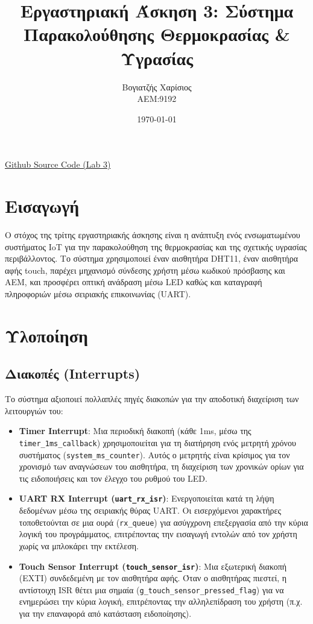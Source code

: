 \documentclass{article}
\title{Εργαστηριακή Άσκηση 3: Σύστημα Παρακολούθησης Θερμοκρασίας & Υγρασίας}
\author{Βογιατζής Χαρίσιος \\ ΑΕΜ:9192}
\date{\today}
\begin{document}
\maketitle

\begin{center}
\href{https://github.com/charisvt/micro-lab3}{Github Source Code (Lab 3)}
\end{center}

\section{Εισαγωγή}

Ο στόχος της τρίτης εργαστηριακής άσκησης είναι η ανάπτυξη ενός ενσωματωμένου συστήματος IoT για την παρακολούθηση της θερμοκρασίας και της σχετικής υγρασίας περιβάλλοντος. Το σύστημα χρησιμοποιεί έναν αισθητήρα DHT11, έναν αισθητήρα αφής touch, παρέχει μηχανισμό σύνδεσης χρήστη μέσω κωδικού πρόσβασης και ΑΕΜ, και προσφέρει οπτική ανάδραση μέσω LED καθώς και καταγραφή πληροφοριών μέσω σειριακής επικοινωνίας (UART).

\section{Υλοποίηση}

\subsection{Διακοπές (Interrupts)}
Το σύστημα αξιοποιεί πολλαπλές πηγές διακοπών για την αποδοτική διαχείριση των λειτουργιών του:
\begin{itemize}
    \item \textbf{Timer Interrupt}: Μια περιοδική διακοπή (κάθε 1ms, μέσω της \texttt{timer\_1ms\_callback}) χρησιμοποιείται για τη διατήρηση ενός μετρητή χρόνου συστήματος (\texttt{system\_ms\_counter}). Αυτός ο μετρητής είναι κρίσιμος για τον χρονισμό των αναγνώσεων του αισθητήρα, τη διαχείριση των χρονικών ορίων για τις ειδοποιήσεις και τον έλεγχο του ρυθμού του LED.
    \item \textbf{UART RX Interrupt (\texttt{uart\_rx\_isr})}: Ενεργοποιείται κατά τη λήψη δεδομένων μέσω της σειριακής θύρας UART. Οι εισερχόμενοι χαρακτήρες τοποθετούνται σε μια ουρά (\texttt{rx\_queue}) για ασύγχρονη επεξεργασία από την κύρια λογική του προγράμματος, επιτρέποντας την εισαγωγή εντολών από τον χρήστη χωρίς να μπλοκάρει την εκτέλεση.
    \item \textbf{Touch Sensor Interrupt (\texttt{touch\_sensor\_isr})}: Μια εξωτερική διακοπή (EXTI) συνδεδεμένη με τον αισθητήρα αφής. Όταν ο αισθητήρας πιεστεί, η αντίστοιχη ISR θέτει μια σημαία (\texttt{g\_touch\_sensor\_pressed\_flag}) για να ενημερώσει την κύρια λογική, επιτρέποντας την αλληλεπίδραση του χρήστη (π.χ. για την επαναφορά από κατάσταση ειδοποίησης).
\end{itemize}
\end{document}
